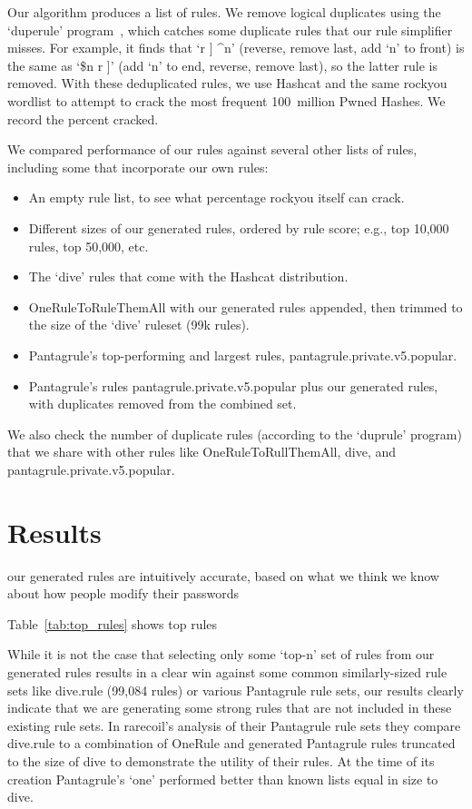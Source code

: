 \documentclass[letterpaper,twocolumn,10pt]{article}
\begin{document}
Our algorithm produces a list of rules. We remove logical duplicates using the `duperule' program~\cite{duprule}, which catches some duplicate rules that our rule simplifier misses. For example, it finds that `r ] \^{}n' (reverse, remove last, add `n' to front) is the same as `\$n r ]' (add `n' to end, reverse, remove last), so the latter rule is removed. With these deduplicated rules, we use Hashcat and the same rockyou wordlist to attempt to crack the most frequent 100~million Pwned Hashes. We record the percent cracked.

We compared performance of our rules against several other lists of rules,
including some that incorporate our own rules:

\begin{itemize}
\item An empty rule list, to see what percentage rockyou itself can crack.
\item Different sizes of our generated rules, ordered by rule score; e.g., top
10,000 rules, top 50,000, etc.
\item The `dive' rules that come with the Hashcat distribution.
\item OneRuleToRuleThemAll with our generated rules appended, then trimmed to the size of the `dive' ruleset (99k rules).
\item Pantagrule's top-performing and largest rules, pantagrule.private.v5.popular.
\item Pantagrule's rules pantagrule.private.v5.popular plus our generated rules, with duplicates removed from the combined set.
\end{itemize}

We also check the number of duplicate rules (according to the `duprule' program) that we share with other rules like OneRuleToRullThemAll, dive, and pantagrule.private.v5.popular.

\section{Results}

our generated rules are intuitively accurate, based on what we think we know
about how people modify their passwords

Table~\ref{tab:top_rules} shows top rules

While it is not the case that selecting only some `top-n' set of rules from our
generated rules results in a clear win against some common similarly-sized rule sets
like dive.rule (99,084 rules) or various Pantagrule rule sets, our results clearly
indicate that we are generating some strong rules that are not included in these
existing rule sets. In rarecoil's analysis of their Pantagrule rule sets they compare
dive.rule to a combination of OneRule and generated Pantagrule rules truncated to
the size of dive to demonstrate the utility of their rules. At the time of its
creation Pantagrule's `one' performed better than known lists equal in size to dive.
\end{document}
